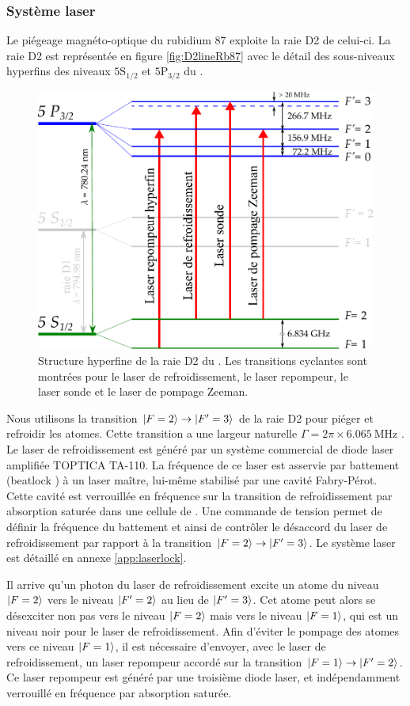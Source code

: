 	\subsubsection*{Système laser}
\noindent Le piégeage magnéto-optique du rubidium 87 exploite la raie D2 de celui-ci.
La raie D2 est représentée en figure \eqref{fig:D2lineRb87} avec le détail des sous-niveaux hyperfins des niveaux $\mathrm{5S_{1/2}}$ et $\mathrm{5P_{3/2}}$ du .
%	
\begin{figure}[!h]
\centering
\includegraphics[width=0.8\linewidth]{figures/setup/coldatoms/D2lineRb87}
\caption[Raie D2 du ]{Structure hyperfine de la raie D2 du .
Les transitions cyclantes sont montrées pour le laser de refroidissement, le laser repompeur, le laser sonde et le laser de pompage Zeeman.
}
\label{fig:D2lineRb87}
\end{figure}
%
Nous utilisons la transition $\ket{F=2} \rightarrow \ket{F'=3}$ de la raie D2 pour piéger et refroidir les atomes.
Cette transition a une largeur naturelle $\Gamma = 2\pi \times \SI{6.065}{\MHz}$ \cite{DATA_STECKRB87}.
Le laser de refroidissement est généré par un système commercial de diode laser amplifiée TOPTICA TA-110.
La fréquence de ce laser est asservie par battement (\og beatlock \fg{}) à un laser maître, lui-même stabilisé par une cavité Fabry-Pérot.
Cette cavité est verrouillée en fréquence sur la transition de refroidissement par absorption saturée dans une cellule de .
Une commande de tension permet de définir la fréquence du battement et ainsi de contrôler le désaccord du laser de refroidissement par rapport à la transition $\ket{F=2}\rightarrow\ket{F'=3}$.
Le système laser est détaillé en annexe \ref{app:laserlock}.

Il arrive qu'un photon du laser de refroidissement excite un atome du niveau $\ket{F=2}$ vers le niveau $\ket{F'=2}$ au lieu de $\ket{F'=3}$.
Cet atome peut alors se désexciter non pas vers le niveau $\ket{F=2}$ mais vers le niveau $\ket{F=1}$, qui est un niveau noir pour le laser de refroidissement.
Afin d'éviter le pompage des atomes vers ce niveau $\ket{F=1}$, il est nécessaire d'envoyer, avec le laser de refroidissement, un laser \og repompeur\fg{} accordé sur la transition $\ket{F=1}\rightarrow \ket{F'=2}$.
Ce laser repompeur est généré par une troisième diode laser, et indépendamment verrouillé en fréquence par absorption saturée.

